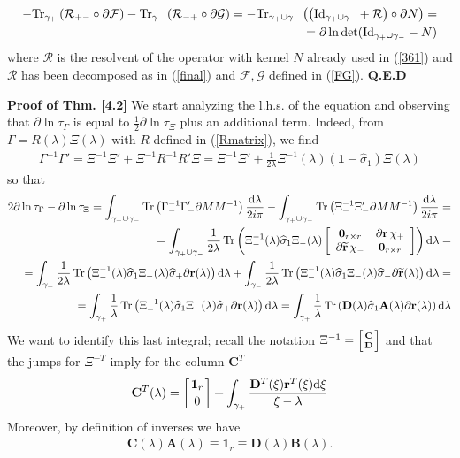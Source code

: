 \documentclass{article}
\def\r{ {\mathbf r}}
\def\A{{\mathbf A}}
\def \B{{\mathbf B}}
\def\s{\sigma}
\def\d{{\rm d}}
\def\1{\mathbf 1}
\def\wh{\widehat}
\def\wt{\widetilde}
\def \pa{\partial}
\def\bea{\begin{eqnarray}}
\def\eea{\end{eqnarray}}
\def\Id{\mathrm{Id}}
\def\Tr{\mathop{{\rm Tr}}}
\def\0{{\mathbf 0}}
\def\QED{ {\bf Q.E.D}\par \vskip 4pt}
\newcommand{\be}{\begin{eqnarray}}
\newcommand{\ee}{\end{eqnarray}}
\def\le{\left}
\def\ri{\right}
\begin{document}
\be
- {\Tr}_{\gamma_+} \le(\mathcal R_{+-}\circ \pa \mathcal F\ri) - {\Tr}_{\gamma_-} \le(\mathcal R_{-+}\circ \pa \mathcal G\ri) = -{\Tr}_{\gamma_+\cup\gamma_-} \le(\le(\Id_{\gamma_+\cup\gamma_-} + \mathcal R\ri)\circ \pa N\ri) =\nonumber\\
= \pa\ln \det(\Id_{\gamma_+\cup \gamma_-} - N)
\ee
where $\mathcal R$ is the resolvent of the operator with kernel $N$ already used in (\ref{361}) and $\mathcal R$ has been decomposed as in (\ref{final}) and $\mathcal F, \mathcal G$ defined in (\ref{FG}). \QED
%
{\bf Proof of Thm. \ref{4.2}}
We start analyzing the l.h.s. of the equation and observing that $\pa\ln\tau_\Gamma$ is equal to $\frac{1}2\pa\ln\tau_\Xi$ plus an additional term. Indeed, from $ \Gamma = R(\lambda) \Xi(\lambda)$ with $R$ defined in (\ref{Rmatrix}),  we find 
\be
\Gamma^{-1} \Gamma' = \Xi^{-1} \Xi'  + \Xi^{-1} R^{-1} R' \Xi = \Xi^{-1} \Xi'   + \frac 1{2\lambda} \Xi^{-1}(\lambda ) (\1 - \wh\s_1) \Xi(\lambda )
\ee
so that 
\bea
2\pa\ln\tau_\Gamma-\pa\ln\tau_\Xi=\int_{\gamma_+  \cup \gamma_-} \Tr \le(\Gamma_{-}^{-1} \Gamma_-' \pa M M^{-1}\ri) \frac {\d \lambda}{2i\pi} 
-
 \int_{\gamma_+  \cup \gamma_-} \Tr \le(\Xi_{-}^{-1} \Xi_-' \pa M M^{-1}\ri) \frac {\d \lambda}{2i\pi} 
=\nonumber\\
 =
 \int_{\gamma_+  \cup \gamma_-} \frac 1{2\lambda}\Tr \le(\Xi_{-}^{-1}(\lambda)\wh  \s_1 \Xi_-(\lambda) \le[
\begin{array}{cc}
\0_{r\times r} & \pa \r \,\chi_+\\
\pa \wt \r\, \chi_- & \0_{r \times r}
\end{array}
\ri]\ri)  \d \lambda 
=\nonumber\\
= 
\int_{\gamma_+} \frac 1{2\lambda}\Tr \le(\Xi_{-}^{-1}(\lambda) \wh \s_1 \Xi_-(\lambda) \wh \s_+\pa \r(\lambda)\ri)  \d \lambda  +
\int_{\gamma_-} \frac 1{2\lambda}\Tr \le(\Xi_{-}^{-1}(\lambda) \wh \s_1 \Xi_-(\lambda) \wh \s_-\pa \wt \r(\lambda) \ri)\d \lambda=\nonumber\\
=
\int_{\gamma_+} \frac 1{\lambda}\Tr \le(\Xi_{-}^{-1}(\lambda) \wh \s_1 \Xi_-(\lambda) \wh \s_+ \pa \r(\lambda) \ri)\d \lambda =
 \int_{\gamma_+} \frac 1{\lambda}\Tr \le(\mathbf D(\lambda) \wh \s_1\A(\lambda)\pa \r(\lambda)\ri)  \d \lambda
\eea
We want to identify this last integral; recall the notation $\Xi^{-1} = \le[{\mathbf C}\atop \mathbf D\ri]$ and that the jumps for $\Xi^{-T}$ imply for the column $\mathbf C^T$
\be
\mathbf C^T(\lambda)  = \le[\1_r \atop 0\ri] +
 \int_{\gamma_+} \frac { \mathbf D^T(\xi) \r^T(\xi)\d\xi}{\xi-\lambda}\label{jump0}
\ee
Moreover, by definition of inverses we have 
\be
\mathbf C (\lambda)\A(\lambda) \equiv \1_r\equiv \mathbf D(\lambda) \B(\lambda).
\ee
\end{document}
